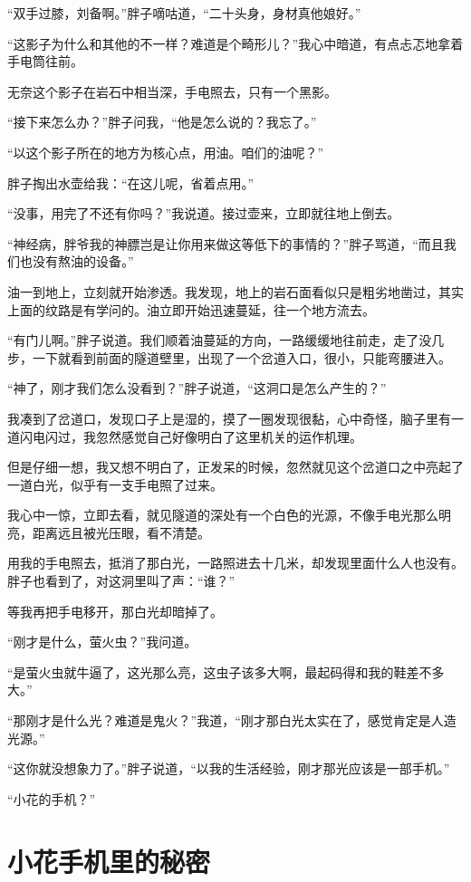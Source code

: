 “双手过膝，刘备啊。”胖子嘀咕道，“二十头身，身材真他娘好。”

“这影子为什么和其他的不一样？难道是个畸形儿？”我心中暗道，有点忐忑地拿着手电筒往前。

无奈这个影子在岩石中相当深，手电照去，只有一个黑影。

“接下来怎么办？”胖子问我，“他是怎么说的？我忘了。”

“以这个影子所在的地方为核心点，用油。咱们的油呢？”

胖子掏出水壶给我：“在这儿呢，省着点用。”

“没事，用完了不还有你吗？”我说道。接过壶来，立即就往地上倒去。

“神经病，胖爷我的神膘岂是让你用来做这等低下的事情的？”胖子骂道，“而且我们也没有熬油的设备。”

油一到地上，立刻就开始渗透。我发现，地上的岩石面看似只是粗劣地凿过，其实上面的纹路是有学问的。油立即开始迅速蔓延，往一个地方流去。

“有门儿啊。”胖子说道。我们顺着油蔓延的方向，一路缓缓地往前走，走了没几步，一下就看到前面的隧道壁里，出现了一个岔道入口，很小，只能弯腰进入。

“神了，刚才我们怎么没看到？”胖子说道，“这洞口是怎么产生的？”

我凑到了岔道口，发现口子上是湿的，摸了一圈发现很黏，心中奇怪，脑子里有一道闪电闪过，我忽然感觉自己好像明白了这里机关的运作机理。

但是仔细一想，我又想不明白了，正发呆的时候，忽然就见这个岔道口之中亮起了一道白光，似乎有一支手电照了过来。

我心中一惊，立即去看，就见隧道的深处有一个白色的光源，不像手电光那么明亮，距离远且被光压眼，看不清楚。

用我的手电照去，抵消了那白光，一路照进去十几米，却发现里面什么人也没有。胖子也看到了，对这洞里叫了声：“谁？”

等我再把手电移开，那白光却暗掉了。

“刚才是什么，萤火虫？”我问道。

“是萤火虫就牛逼了，这光那么亮，这虫子该多大啊，最起码得和我的鞋差不多大。”

“那刚才是什么光？难道是鬼火？”我道，“刚才那白光太实在了，感觉肯定是人造光源。”

“这你就没想象力了。”胖子说道，“以我的生活经验，刚才那光应该是一部手机。”

“小花的手机？”

\chapter{小花手机里的秘密}

